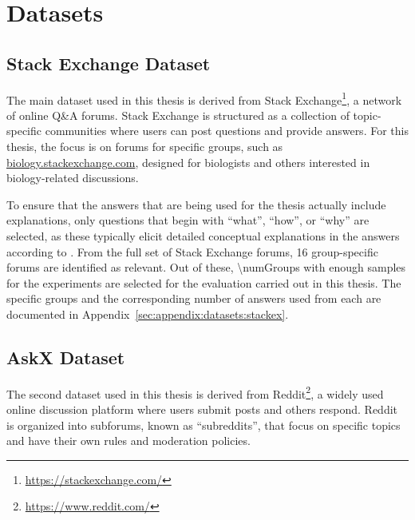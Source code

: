 \chapter{Datasets}%
\label{sec:datasets}


\section{Stack Exchange Dataset}%
\label{sec:datasets:stackex}
The main dataset used in this thesis is derived from Stack Exchange\footnote{\url{https://stackexchange.com/}}, a network of online Q\&A forums. Stack Exchange is structured as a collection of topic-specific communities where users can post questions and provide answers. For this thesis, the focus is on forums for specific groups, such as \url{biology.stackexchange.com}, designed for biologists and others interested in biology-related discussions.

To ensure that the answers that are being used for the thesis actually include explanations, only questions that begin with \enquote{what}, \enquote{how}, or \enquote{why} are selected, as these typically elicit detailed conceptual explanations in the answers according to \citet{millerExplanationArtificialIntelligence2019}. From the full set of Stack Exchange forums, \num{16} group-specific forums are identified as relevant.
Out of these, \num{\numGroups} with enough samples for the experiments are selected for the evaluation carried out in this thesis. The specific groups and the corresponding number of answers used from each are documented in Appendix~\ref{sec:appendix:datasets:stackex}.

\section{AskX Dataset}%
\label{sec:datasets:askx}
The second dataset used in this thesis is derived from Reddit\footnote{\url{https://www.reddit.com/}}, a widely used online discussion platform where users submit posts and others respond. Reddit is organized into subforums, known as \enquote{subreddits}, that focus on specific topics and have their own rules and moderation policies.

